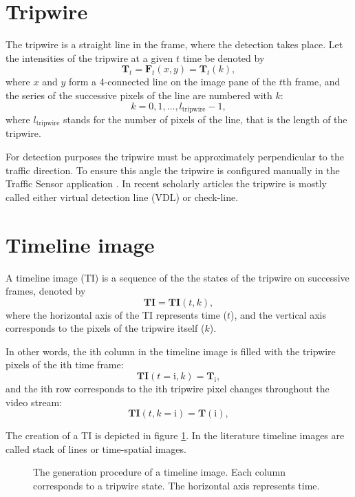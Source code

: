 \section{Tripwire}
The tripwire is a straight line in the frame, where the detection takes place.
Let the intensities of the tripwire at a given $t$ time be denoted by 
\begin{displaymath}
\boldsymbol{T}_t=\boldsymbol{F}_t(x,y)=\boldsymbol{T}_t(k),
\end{displaymath}
where $x$ and $y$ form a 4-connected line on the image pane of the $t$th frame, and the series of the successive pixels of the line are numbered with $k$:
\begin{displaymath}
	k=0,1,\dotsc,l_{\text{tripwire}}-1,
\end{displaymath}
where $l_{\text{tripwire}}$ stands for the number of pixels of the line, that is the length of the tripwire.

For detection purposes the tripwire must be approximately perpendicular to the traffic direction.
To ensure this angle the tripwire is configured manually in the Traffic Sensor application .
In recent scholarly articles the tripwire is mostly called either virtual detection line (VDL) or check-line.
\section{Timeline image}
A timeline image (TI) is a sequence of the the states of the tripwire on successive frames, denoted by
\begin{displaymath}
	\boldsymbol{TI}=\boldsymbol{TI}(t,k),
\end{displaymath}
where the horizontal axis of the TI represents time ($t$), and the vertical axis corresponds to the pixels of the tripwire itself ($k$).
 
In other words, the $\text{i}$th column in the timeline image is filled with the tripwire pixels of the $\text{i}$th time frame:
\begin{displaymath}
	\boldsymbol{TI}(t=\text{i},k)=\boldsymbol{T}_\text{i},
\end{displaymath}
and the $\text{i}$th row corresponds to the $\text{i}$th tripwire pixel changes throughout the video stream:
\begin{displaymath}
\boldsymbol{TI}(t,k=\text{i})=\boldsymbol{T}(\text{i}),
\end{displaymath}

The creation of a TI is depicted in figure \ref{fig:TI_creation}.
In the literature timeline images are called stack of lines or time-spatial images.

\begin{figure}[bh]
	\centering
	\scalebox{.7}{}
	\label{fig:TI_creation}
	\caption{The generation procedure of a timeline image. Each column corresponds to a tripwire state. The horizontal axis represents time.}
\end{figure}
